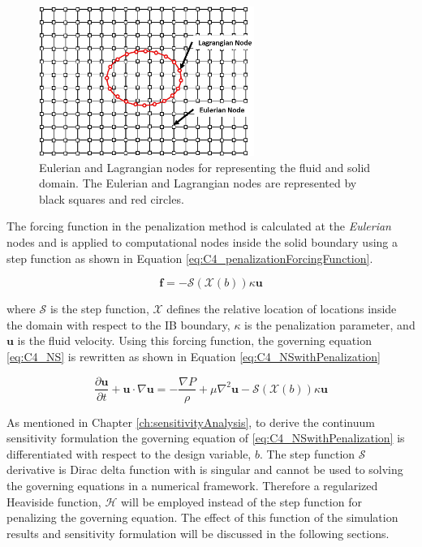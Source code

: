 \begin{figure}[H]
	\centering
	\includegraphics[width=7.00cm]{Chapter_4/figure/lagrangian_and_eulerian_nodes.jpg}
	\caption{Eulerian and Lagrangian nodes for representing the fluid and solid domain. The Eulerian and Lagrangian nodes are represented by black squares and red circles.}
	\label{fig:C4_lagrangianAndEulerianDomain}
\end{figure}

The forcing function in the penalization method is calculated at the \emph{Eulerian} nodes and is applied to computational nodes inside the solid boundary using a step function as shown in Equation \eqref{eq:C4_penalizationForcingFunction}.

\begin{equation}\label{eq:C4_penalizationForcingFunction}
	\mathbf{f} = -\mathcal{S}(\mathcal{X}(b)) \kappa \mathbf{u}
\end{equation}

where $\mathcal{S}$ is the step function, $\mathcal{X}$ defines the relative location of locations inside the domain with respect to the IB boundary, $\kappa$ is the penalization parameter, and $\mathbf{u}$ is the fluid velocity. Using this forcing function, the governing equation \eqref{eq:C4_NS} is rewritten as shown in Equation \eqref{eq:C4_NSwithPenalization}

\begin{equation}\label{eq:C4_NSwithPenalization}
	\frac{\partial \mathbf{u}}{\partial t} + \mathbf{u} \cdot \nabla \mathbf{u} = 
	-\frac{\nabla P}{\rho} + \mu \nabla^2 \mathbf{u} -\mathcal{S}(\mathcal{X}(b)) \kappa \mathbf{u}
\end{equation}

As mentioned in Chapter \ref{ch:sensitivityAnalysis}, to derive the continuum sensitivity formulation the governing equation of \eqref{eq:C4_NSwithPenalization} is differentiated with respect to the design variable, $b$. The step function $\mathcal{S}$ derivative is Dirac delta function with is singular and cannot be used to solving the governing equations in a numerical framework. Therefore a regularized Heaviside function, $\mathcal{H}$ will be employed instead of the step function for penalizing the governing equation. The effect of this function of the simulation results and sensitivity formulation will be discussed in the following sections.

